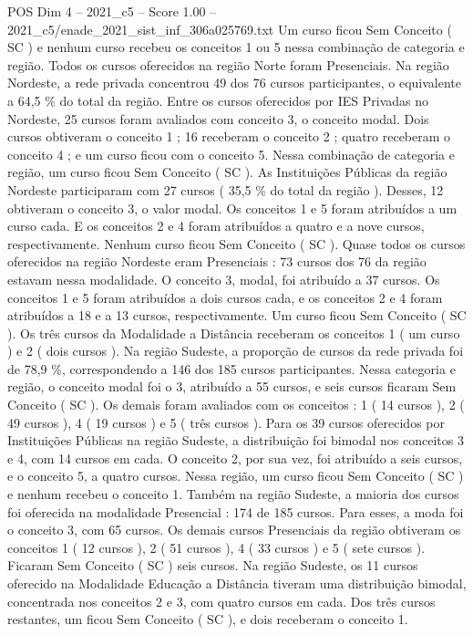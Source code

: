 \begin{textsample}{POS Dim 4 – 2021\_c5 – Score 1.00 – 2021\_c5/enade\_2021\_sist\_inf\_306a025769.txt}
Um curso ficou Sem Conceito ( SC ) e nenhum curso recebeu os conceitos 1 ou 5 nessa combinação de categoria e região.
Todos os cursos oferecidos na região Norte foram Presenciais.
Na região Nordeste, a rede privada concentrou 49 dos 76 cursos participantes, o equivalente a 64,5 \% do total da região.
Entre os cursos oferecidos por IES Privadas no Nordeste, 25 cursos foram avaliados com conceito 3, o conceito modal.
Dois cursos obtiveram o conceito 1 ; 16 receberam o conceito 2 ; quatro receberam o conceito 4 ; e um curso ficou com o conceito 5.
Nessa combinação de categoria e região, um curso ficou Sem Conceito ( SC ).
As Instituições Públicas da região Nordeste participaram com 27 cursos ( 35,5 \% do total da região ).
Desses, 12 obtiveram o conceito 3, o valor modal.
Os conceitos 1 e 5 foram atribuídos a um curso cada.
E os conceitos 2 e 4 foram atribuídos a quatro e a nove cursos, respectivamente.
Nenhum curso ficou Sem Conceito ( SC ).
Quase todos os cursos oferecidos na região Nordeste eram Presenciais : 73 cursos dos 76 da região estavam nessa modalidade.
O conceito 3, modal, foi atribuído a 37 cursos.
Os conceitos 1 e 5 foram atribuídos a dois cursos cada, e os conceitos 2 e 4 foram atribuídos a 18 e a 13 cursos, respectivamente.
Um curso ficou Sem Conceito ( SC ).
Os três cursos da Modalidade a Distância receberam os conceitos 1 ( um curso ) e 2 ( dois cursos ).
Na região Sudeste, a proporção de cursos da rede privada foi de 78,9 \%, correspondendo a 146 dos 185 cursos participantes.
Nessa categoria e região, o conceito modal foi o 3, atribuído a 55 cursos, e seis cursos ficaram Sem Conceito ( SC ).
Os demais foram avaliados com os conceitos : 1 ( 14 cursos ), 2 ( 49 cursos ), 4 ( 19 cursos ) e 5 ( três cursos ).
Para os 39 cursos oferecidos por Instituições Públicas na região Sudeste, a distribuição foi bimodal nos conceitos 3 e 4, com 14 cursos em cada.
O conceito 2, por sua vez, foi atribuído a seis cursos, e o conceito 5, a quatro cursos.
Nessa região, um curso ficou Sem Conceito ( SC ) e nenhum recebeu o conceito 1.
Também na região Sudeste, a maioria dos cursos foi oferecida na modalidade Presencial : 174 de 185 cursos.
Para esses, a moda foi o conceito 3, com 65 cursos.
Os demais cursos Presenciais da região obtiveram os conceitos 1 ( 12 cursos ), 2 ( 51 cursos ), 4 ( 33 cursos ) e 5 ( sete cursos ).
Ficaram Sem Conceito ( SC ) seis cursos.
Na região Sudeste, os 11 cursos oferecido na Modalidade Educação a Distância tiveram uma distribuição bimodal, concentrada nos conceitos 2 e 3, com quatro cursos em cada.
Dos três cursos restantes, um ficou Sem Conceito ( SC ), e dois receberam o conceito 1.

\end{textsample}
